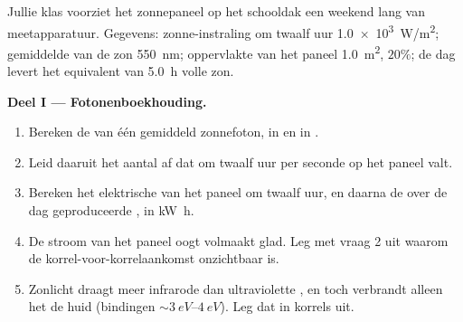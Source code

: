 \begin{problem}
\label{pb:g12:quantum-world:1}
Jullie klas voorziet het zonnepaneel op het schooldak een weekend lang van
meetapparatuur. Gegevens: zonne-instraling om twaalf uur \qty{1.0e3}{W/m^2};
gemiddelde  van de zon \qty{550}{nm}; oppervlakte van het paneel
\qty{1.0}{m^2},  $20\%$; de dag levert het equivalent van
\qty{5.0}{h} volle zon.

\medskip
\noindent\textbf{Deel I --- Fotonenboekhouding.}
\begin{enumerate}
  \item Bereken de  van één gemiddeld zonnefoton, in  en in
        .
  \item Leid daaruit het aantal  af dat om twaalf uur per seconde op
        het paneel valt.
  \item Bereken het elektrische  van het paneel om twaalf uur, en
        daarna de over de dag geproduceerde , in \unit{kW.h}.
  \item De stroom van het paneel oogt volmaakt glad. Leg met vraag 2 uit
        waarom de korrel-voor-korrelaankomst onzichtbaar is.
  \item Zonlicht draagt meer infrarode dan ultraviolette , en toch
        verbrandt alleen het  de huid (bindingen
        $\sim \qtyrange{3}{4}{eV}$). Leg dat in korrels uit.
\end{enumerate}


\end{problem}
